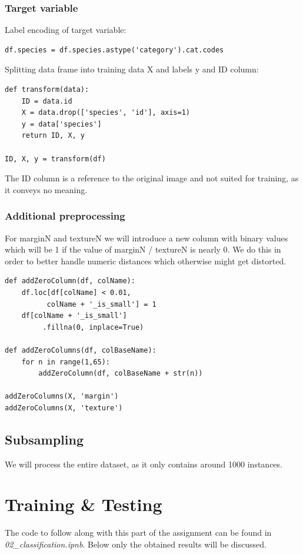 \documentclass{sig-alternate-05-2015}
\begin{document}
\subsubsection{Target variable}

Label encoding of target variable:
\begin{verbatim}
df.species = df.species.astype('category').cat.codes
\end{verbatim}

Splitting data frame into training data X and labels y and ID column:
\begin{verbatim}
def transform(data):
    ID = data.id
    X = data.drop(['species', 'id'], axis=1)
    y = data['species']
    return ID, X, y

ID, X, y = transform(df)
\end{verbatim}

The ID column is a reference to the original image and not suited for training, as it conveys no meaning.

\subsubsection{Additional preprocessing}
For marginN and textureN we will introduce a new column with binary values which will be 1 if the value of marginN / textureN is nearly 0.
We do this in order to better handle numeric distances which otherwise might get distorted.

\begin{verbatim}
def addZeroColumn(df, colName):
    df.loc[df[colName] < 0.01, 
          colName + '_is_small'] = 1
    df[colName + '_is_small']
         .fillna(0, inplace=True)

def addZeroColumns(df, colBaseName):
    for n in range(1,65):
        addZeroColumn(df, colBaseName + str(n))
        
addZeroColumns(X, 'margin')
addZeroColumns(X, 'texture')
\end{verbatim}

\subsection{Subsampling}
We will process the entire dataset, as it only contains around 1000 instances.

\section{Training \& Testing}
The code to follow along with this part of the assignment can be found in \emph{02\_classification.ipnb}. Below only the obtained results will be discussed.
\end{document}
